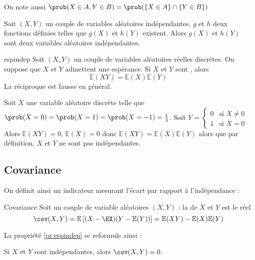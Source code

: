 	On note aussi $\prob(X \in A, Y \in B) = \prob(\{X \in A\} \cap \{Y \in B\})$

\begin{proposition}{}{}
	Soit  $(X,Y)$ un couple de variables aléatoires indépendantes, $g$ et $h$ deux fonctions définies telles que $g(X)$ et $h(Y)$ existent. Alors $g(X)$ et $h(Y)$ sont deux variables aléatoires indépendantes.
\end{proposition}


\begin{proposition}{}{espindep}
		Soit  $(X,Y)$ un couple de variables aléatoires réelles discrètes. On suppose que $X$ et $Y$ admettent une espérance. Si $X$ et $Y$ sont , alors $$\mathbb{E}(XY)=\mathbb{E}(X)\mathbb{E}(Y)$$
		La réciproque est fausse en général.
\end{proposition}

		\begin{exemple}{}{}
	Soit $X$ une variable aléatoire discrète telle que $\prob(X=0) = \prob(X=1) = \prob(X=-1) = \frac{1}{3}$. Soit $Y=\left\{\begin{array}{cl}
	0&\text{si $X \neq 0$}\\
	1 &\text{si $X=0$}
	\end{array}\right.$ Alors $\mathbb{E}(XY) = 0$, $\mathbb{E}(X) = 0$ donc $\mathbb{E}(XY)=\mathbb{E}(X)\mathbb{E}(Y)$ alors que par définition, $X$ et $Y$ ne sont pas indépendantes.
\end{exemple}

\subsection{Covariance}

On définit ainsi un indicateur mesurant l'écart par rapport à l'indépendance :

\begin{definition}{Covariance}{}
	Soit un couple de variable aléatoires $(X,Y)$ : la  de $X$ et $Y$ est le réel 
	$$\cov(X,Y) = \mathbb{E} \left[ (X-\EX)(Y-\mathbb{E}(Y)) \right] = \mathbb{E}(XY)-\mathbb{E}(X)\mathbb{E}(Y)$$
\end{definition}

La propriété \ref{pr:espindep} se reformule ainsi : 

\begin{proposition}{}{}
	Si $X$ et $Y$ sont indépendantes, alors $\cov(X,Y)=0$.
\end{proposition}


